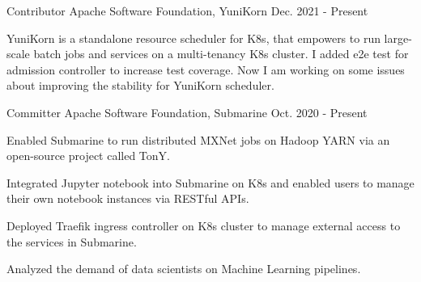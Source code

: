 

\begin{cventries}

  \cventry
    {Contributor} %
    {Apache Software Foundation, YuniKorn} %
    {} %
    {Dec. 2021 - Present} %
    {
      \begin{cvitems} %
        \item {YuniKorn is a standalone resource scheduler for K8s, that empowers to run large-scale batch jobs and services on a multi-tenancy K8s cluster. I added e2e test for admission controller to increase test coverage. Now I am working on some issues about improving the stability for YuniKorn scheduler.}
      \end{cvitems}
    }
  \cventry
    {Committer} %
    {Apache Software Foundation, Submarine} %
    {} %
    {Oct. 2020 - Present} %
    {
      \begin{cvitems} %
        \item {Enabled Submarine to run distributed MXNet jobs on Hadoop YARN via an open-source project called TonY.}
        \item {Integrated Jupyter notebook into Submarine on K8s and enabled users to manage their own notebook instances via RESTful APIs.}
        \item {Deployed Traefik ingress controller on K8s cluster to manage external access to the services in Submarine.}
        \item {Analyzed the demand of data scientists on Machine Learning pipelines.}
      \end{cvitems}
    }
\end{cventries}
